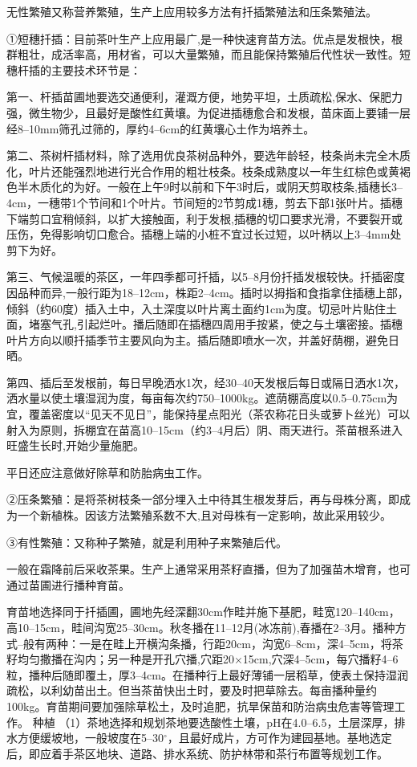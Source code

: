 \documentclass{ctexbook}
\begin{document}
无性繁殖又称营养繁殖，生产上应用较多方法有扦插繁殖法和压条繁殖法。

①短穗扦插：目前茶叶生产上应用最广,是一种快速育苗方法。优点是发根快，根群粗壮，成活率高，用材省，可以大量繁殖，而且能保持繁殖后代性状一致性。短穗杆插的主要技术环节是：

第一、杆插苗圃地要选交通便利，灌溉方便，地势平坦，土质疏松,保水、保肥力强，微生物少，且最好是酸性红黄壤。为促进插穗愈合和发根，苗床面上要铺一层经8--10mm筛孔过筛的，厚约4--6cm的红黄壤心土作为培养土。

第二、茶树杆插材料，除了选用优良茶树品种外，要选年龄轻，枝条尚未完全木质化，叶片还能强烈地进行光合作用的粗壮枝条。枝条成熟度以一年生红棕色或黄褐色半木质化的为好。一般在上午9时以前和下午3时后，或阴天剪取枝条,插穗长3--4cm，一穗带1个节间和1个叶片。节间短的2节剪成1穗，剪去下部1张叶片。插穗下端剪口宜稍倾斜，以扩大接触面，利于发根,插穗的切口要求光滑，不要裂开或压伤，免得影响切口愈合。插穗上端的小桩不宜过长过短，以叶柄以上3--4mm处剪下为好。

第三、气候温暖的茶区，一年四季都可扦插，以5--8月份扦插发根较快。扦插密度因品种而异,一般行距为18--12cm，株距2--4cm。插时以拇指和食指拿住插穗上部，倾斜（约60度）插入土中，入土深度以叶片离土面约1cm为度。切忌叶片贴住土面，堵塞气孔,引起烂叶。播后随即在插穗四周用手按紧，使之与土壤密接。插穗叶片方向以顺扦插季节主要风向为主。插后随即喷水一次，并盖好荫棚，避免日晒。

第四、插后至发根前，每日早晚洒水1次，经30--40天发根后每日或隔日洒水1次，洒水量以使土壤湿润为度，每亩每次约750--1000kg。遮荫棚高度以0.5--0.75cm为宜，覆盖密度以“见天不见日”，能保持星点阳光（茶农称花日头或萝卜丝光）可以射入为原则，拆棚宜在苗高10--15cm（约3--4月后）阴、雨天进行。茶苗根系进入旺盛生长时,开始少量施肥。

平日还应注意做好除草和防胎病虫工作。

②压条繁殖：是将茶树枝条一郃分埋入土中待其生根发芽后，再与母株分离，即成为一个新植株。因该方法繁殖系数不大,且对母株有一定影响，故此采用较少。

③有性繁殖：又称种子繁殖，就是利用种子来繁殖后代。

一般在霜降前后采收茶果。生产上通常采用茶籽直播，但为了加强苗木增育，也可通过苗圃进行播种育苗。

育苗地选择同于扦插圃，圃地先经深翻30cm作畦并施下基肥，畦宽120--140cm，高10--15cm，畦间沟宽25--30cm。秋冬播在11--12月(冰冻前),春播在2--3月。播种方式--般有两种：一是在畦上开横沟条播，行距20cm，沟宽6--8cm，深4--5cm，将茶籽均匀撒播在沟内；另一种是开孔穴播,穴距20$\times$15cm,穴深4--5cm，每穴播籽4--6粒，播种后随即覆土，厚3--4cm。在播种行上最好薄铺一层稻草，使表土保持湿润疏松，以利幼苗出土。但当茶苗快出土时，要及时把草除去。每亩播种量约100kg。育苗期间要加强除草松土，及时追肥，抗旱保苗和防治病虫危害等管理工作。
种植
（1）茶地选择和规划茶地要选酸性土壤，pH在4.0--6.5，土层深厚，排水方便缓坡地，一般坡度在5--30$^{\circ}$，且最好成片，方可作为建园基地。基地选定后，即应着手茶区地块、道路、排水系统、防护林带和茶行布置等规划工作。
\end{document}
